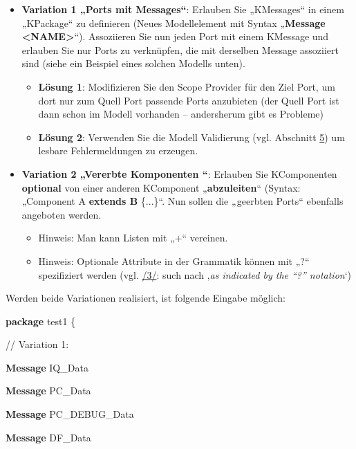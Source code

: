\documentclass[a4]{article}
\providecommand{\tightlist}{%
  \setlength{\itemsep}{0pt}\setlength{\parskip}{0pt}}
\begin{document}
\begin{itemize}
\item
  \textbf{Variation 1 „Ports mit Messages``}: Erlauben Sie „KMessages``
  in einem „KPackage`` zu definieren (Neues Modellelement mit Syntax
  „\textbf{Message \textless{}NAME\textgreater{}}``). Assoziieren Sie
  nun jeden Port mit einem KMessage und erlauben Sie nur Ports zu
  verknüpfen, die mit derselben Message assoziiert sind (siehe ein
  Beispiel eines solchen Modells unten).

  \begin{itemize}
  \tightlist
  \item
    \textbf{Lösung 1}: Modifizieren Sie den Scope Provider für den Ziel
    Port, um dort nur zum Quell Port passende Ports anzubieten (der
    Quell Port ist dann schon im Modell vorhanden -- andersherum gibt es
    Probleme)
  \item
    \textbf{Lösung 2}: Verwenden Sie die Modell Validierung (vgl.
    Abschnitt \protect\hyperlink{anchor-28}{5}) um lesbare
    Fehlermeldungen zu erzeugen.
  \end{itemize}
\item
  \textbf{Variation 2 „Vererbte Komponenten ``}: Erlauben Sie
  KComponenten \textbf{optional }von einer anderen KComponent
  „\textbf{abzuleiten}`` (Syntax: „Component A \textbf{extends B}
  \{...\}``. Nun sollen die „geerbten Ports`` ebenfalls angeboten
  werden.

  \begin{itemize}
  \tightlist
  \item
    Hinweis: Man kann Listen mit „+`` vereinen.
  \item
    Hinweis: Optionale Attribute in der Grammatik können mit „?``
    spezifiziert werden (vgl. \protect\hyperlink{anchor-3}{/3/}: such
    nach ‚\emph{as indicated by the ``?'' notation}`)
  \end{itemize}
\end{itemize}

Werden beide Variationen realisiert, ist folgende Eingabe möglich:

\textbf{package}
test1 \{

// Variation 1:

\textbf{Message} IQ\_Data

\textbf{Message} PC\_Data

\textbf{Message} PC\_DEBUG\_Data

\textbf{Message} DF\_Data
\end{document}
